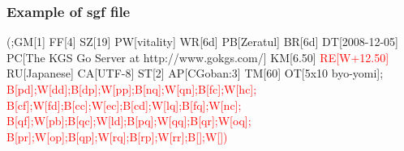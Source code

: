 \documentclass{beamer}
\begin{document}

\begin{frame}[fragile]
\frametitle{Example of sgf file}

\begin{semiverbatim}
(;GM[1] FF[4] SZ[19] PW[vitality] WR[6d]
PB[Zeratul] BR[6d] DT[2008-12-05] 
PC[The KGS Go Server at http://www.gokgs.com/]
KM[6.50] \textcolor{red}{RE[W+12.50]} RU[Japanese] CA[UTF-8] ST[2] 
AP[CGoban:3] TM[60] OT[5x10 byo-yomi];
\textcolor{red}{B[pd];W[dd];B[dp];W[pp];B[nq];W[qn];B[fc];W[hc];
B[cf];W[fd];B[cc];W[ec];B[cd];W[lq];B[fq];W[nc];
B[qf];W[pb];B[qc];W[ld];B[pq];W[qq];B[qr];W[oq];
B[pr];W[op];B[qp];W[rq];B[rp];W[rr];B[];W[])}
\end{semiverbatim}

\end{frame}

\end{document}
